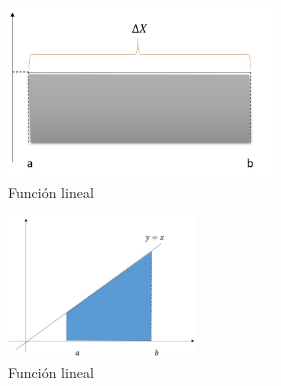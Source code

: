 \documentclass[10pt,twoside]{SelfArx} %
\begin{document}
 

\begin{figure}[h]
	\centering
	\includegraphics[width=7cm]{integracion5}
	\caption{Función lineal}
	\label{integracion5}
\end{figure}

    \begin{figure}[h]
    	\centering
    	\includegraphics[width=5cm]{integracion4}
    	\caption{Función lineal}
    	\label{integracion4}
    \end{figure}
\end{document}
